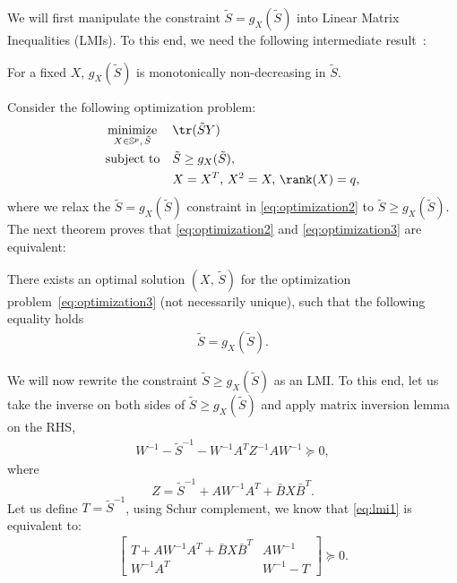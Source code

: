   We will first manipulate the constraint $\tilde S = g_X(\tilde S)$ into  Linear Matrix Inequalities (LMIs). To this end, we need the following intermediate result~\cite{Sinopoli_2004}:
  \begin{proposition}
    For a fixed $X$, $g_X(\tilde S)$ is monotonically non-decreasing in $\tilde S$.
  \end{proposition}


  Consider the following optimization problem:
  \begin{align}
    &\mathop{\textrm{minimize}}\limits_{X\in\mathbb S^p,\,\tilde S}&
    & \tr(\tilde SY) \label{eq:optimization3}\\
    &\textrm{subject to}&
    &\tilde S \geq g_X(\tilde S), \nonumber\\
    &&
    &X = X^T,\,X^2 = X,\,\rank(X) = q,\nonumber
  \end{align}
  where we relax the $\tilde S = g_X(\tilde S)$ constraint in \eqref{eq:optimization2} to $\tilde S\geq g_X(\tilde S)$. The next theorem proves that \eqref{eq:optimization2} and \eqref{eq:optimization3} are equivalent:
  \begin{lemma}\label{lemma:X}
    There exists an optimal solution $(X,\,\tilde S)$ for the optimization problem~\eqref{eq:optimization3} (not necessarily unique), such that the following equality holds
    \begin{align*}
      \tilde S = g_X(\tilde S).
    \end{align*}
  \end{lemma}

  We will now rewrite the constraint $\tilde S \geq g_X(\tilde S)$ as an LMI. To this end, let us take the inverse on both sides of $\tilde S\geq g_X(\tilde S)$ and apply matrix inversion lemma on the RHS, 
  \begin{align}
    \label{eq:lmi1}
    W^{-1} - \tilde S^{-1} - W^{-1}A^TZ^{-1}AW^{-1}\succeq 0,
  \end{align}
  where
  \begin{displaymath}
    Z = \tilde S^{-1}+AW^{-1}A^T+\bar BX\bar B^T.
  \end{displaymath}
  Let us define $T =\tilde S^{-1}$, using Schur complement, we know that \eqref{eq:lmi1} is equivalent to:
  \begin{align}
    \label{eq:lmi2}
    \begin{bmatrix}
      T+AW^{-1}A^T+\bar BX\bar B^T & AW^{-1}\\
      W^{-1}A^T & W^{-1} - T
    \end{bmatrix} \succeq 0 .
  \end{align}

